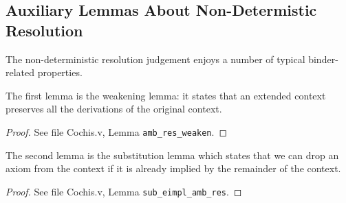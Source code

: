 \subsection{Auxiliary Lemmas About Non-Determistic Resolution}

The non-deterministic resolution judgement enjoys a number of
typical binder-related properties.

The first lemma is the weakening lemma: it states that an extended context
preserves all the derivations of the original context.

{\centering
{}}
\begin{proof}
See file Cochis.v, Lemma \texttt{amb\_res\_weaken}.
\end{proof}
The second lemma is the substitution lemma which states that
we can drop an axiom from the context if it is already implied
by the remainder of the context.

{\centering
{}}
\begin{proof}
	See file Cochis.v, Lemma \texttt{sub\_eimpl\_amb\_res}.
\end{proof}


